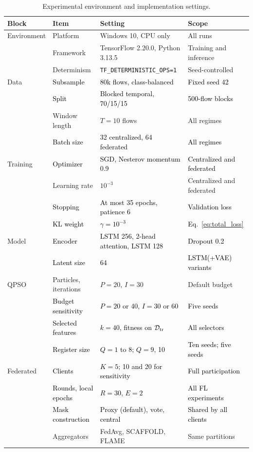 \documentclass[conference]{IEEEtran}
\begin{document}
\begin{table}[!htbp]
\centering
\caption{Experimental environment and implementation settings.}
\label{tab:impl_setup}
\def\rc#1{\textcolor{black}{#1}}
\setlength{\tabcolsep}{8pt}
\renewcommand{\arraystretch}{1.3}
\begin{tabular}{l l l l}
\hline\toprule
\textbf{Block} & \textbf{Item} & \textbf{Setting} & \textbf{Scope} \\
\hline\toprule
Environment & Platform & Windows 10, CPU only & All runs \\
 & Framework & TensorFlow 2.20.0, Python 3.13.5 & Training and inference \\
 & Determinism & \texttt{TF\_DETERMINISTIC\_OPS=1} & Seed-controlled \\
\midrule
Data & \rc{Subsample} & \rc{80k flows, class-balanced} & \rc{Fixed seed 42} \\
 & \rc{Split} & \rc{Blocked temporal, 70/15/15} & \rc{500-flow blocks} \\
 & Window length & $T=10$ flows & All regimes \\
 & \rc{Batch size} & \rc{32 centralized, 64 federated} & \rc{All regimes} \\
\midrule
Training & \rc{Optimizer} & \rc{SGD, Nesterov momentum 0.9} & \rc{Centralized and federated} \\
 & Learning rate & $10^{-3}$ & Centralized and federated \\
 & \rc{Stopping} & \rc{At most 35 epochs, patience 6} & \rc{Validation loss} \\
 & \rc{KL weight} & \rc{$\gamma=10^{-3}$} & \rc{Eq.~\eqref{eq:total_loss}} \\
\midrule
Model & \rc{Encoder} & \rc{LSTM 256, 2-head attention, LSTM 128} & \rc{Dropout 0.2} \\
 & \rc{Latent size} & \rc{64} & \rc{LSTM(+VAE) variants} \\
\midrule
QPSO & Particles, iterations & $P=20$, $I=30$ & Default budget \\
 & \rc{Budget sensitivity} & \rc{$P=20$ or 40, $I=30$ or 60} & \rc{Five seeds} \\
 & \rc{Selected features} & \rc{$k=40$, fitness on $\mathcal{D}_{\rm tr}$} & \rc{All selectors} \\
 & \rc{Register size} & \rc{$Q=1$ to 8; $Q=9$, 10} & \rc{Ten seeds; five seeds} \\
\midrule
Federated & \rc{Clients} & \rc{$K=5$; 10 and 20 for sensitivity} & \rc{Full participation} \\
 & \rc{Rounds, local epochs} & \rc{$R=30$, $E=2$} & \rc{All FL experiments} \\
 & \rc{Mask construction} & \rc{Proxy (default), vote, central} & \rc{Shared by all clients} \\
 & Aggregators & FedAvg, SCAFFOLD, FLAME & Same partitions \\
\hline\toprule
\end{tabular}
\end{table}
\end{document}
